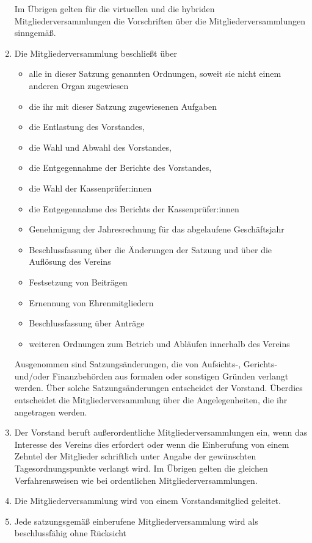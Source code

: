 \documentclass[12pt]{article}
\begin{document}
\begin{enumerate}[label=(\arabic*)]
	      Im Übrigen gelten für die virtuellen und die hybriden Mitgliederversammlungen die
	      Vorschriften über die Mitgliederversammlungen sinngemäß.
	\item Die Mitgliederversammlung beschließt über
	      \begin{itemize}
		      \item alle in dieser Satzung genannten Ordnungen, soweit sie nicht einem anderen Organ zugewiesen
		      \item die ihr mit dieser Satzung zugewiesenen Aufgaben
		      \item die Entlastung des Vorstandes,
		      \item die Wahl und Abwahl des Vorstandes,
		      \item die Entgegennahme der Berichte des Vorstandes,
		      \item die Wahl der Kassenprüfer:innen
		      \item die Entgegennahme des Berichts der Kassenprüfer:innen
		      \item Genehmigung der Jahresrechnung für das abgelaufene Geschäftsjahr
		      \item Beschlussfassung über die Änderungen der Satzung und über die Auflösung des Vereins
		      \item Festsetzung von Beiträgen
		      \item Ernennung von Ehrenmitgliedern
		      \item Beschlussfassung über Anträge
		      \item weiteren Ordnungen zum Betrieb und Abläufen innerhalb des Vereins
	      \end{itemize}
	      Ausgenommen sind Satzungsänderungen, die von Aufsichts-, Gerichts- und/oder Finanzbehörden
	      aus formalen oder sonstigen Gründen verlangt werden. Über solche Satzungsänderungen
	      entscheidet der Vorstand.
	      Überdies entscheidet die Mitgliederversammlung über die Angelegenheiten, die ihr angetragen
	      werden.
	\item Der Vorstand beruft außerordentliche Mitgliederversammlungen ein, wenn das Interesse des
	      Vereins dies erfordert oder wenn die Einberufung von einem Zehntel der Mitglieder schriftlich unter
	      Angabe der gewünschten Tagesordnungspunkte verlangt wird. Im Übrigen gelten die gleichen
	      Verfahrensweisen wie bei ordentlichen Mitgliederversammlungen.
	\item Die Mitgliederversammlung wird von einem Vorstandsmitglied geleitet.
	\item Jede satzungsgemäß einberufene Mitgliederversammlung wird als beschlussfähig ohne Rücksicht

\end{enumerate}
\end{document}
